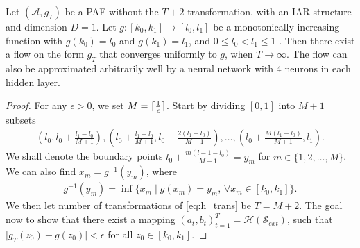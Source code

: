 \begin{lemma}\label{lemma:paf_one_dim}
    Let \((\mathcal{A}, g_T)\) be a PAF without the \(T+2\) transformation, with an IAR-structure and dimension \(D=1\).
    Let \(g\colon [k_0,k_1] \rightarrow [l_0,l_1]\) be a 
    monotonically increasing function with \(g(k_0) = l_0\) and \(g(k_1) = l_1\), and \(0 \leq l_0 < l_1 \leq 1\) . 
    Then there exist a flow on the form \(g_T\) that converges uniformly to \(g\), when \(T \rightarrow \infty\). The flow can also be approximated 
    arbitrarily well by a neural network with \(4\) neurons in each hidden layer.
\end{lemma}
\begin{proof}
    For any \(\epsilon > 0\), we set \(M = \lceil\frac{1}{\epsilon}\rceil\). Start by dividing \([0,1]\) into \(M+1\)
    subsets 
    \begin{align*}
        \left(l_0,l_0 + \frac{l_1-l_0}{M+1}\right), \left(l_0+\frac{l_1-l_0}{M+1}, l_0 + \frac{2(l_1-l_0)}{M+1}\right),\dots, 
        \left(l_0 +\frac{M(l_1-l_0)}{M+1}, l_1\right). 
    \end{align*}
    We shall denote the boundary points \(l_0 + \frac{m(l-1-l_0)}{M+1} = y_{m}\) for \(m\in \{1,2,\dots,M\}\). 
    We can also find \(x_m = g^{-1}(y_m)\), where 
    \begin{align*}
        g^{-1}(y_m) = \inf\{x_m \mid g(x_m) = y_m,\, \forall x_m \in [k_0,k_1]\}.
    \end{align*}
    We then let number of transformations of \cref{eq:h_trans} be \(T = M + 2\).
    The goal now to show that there exist a mapping \((a_t, b_t)^{T}_{t=1} = 
    \mathcal{H}(\mathcal{S}_{ext})\), such that \(\lvert g_T(z_0) - g(z_0)\rvert < \epsilon\) for all \(z_0 \in [k_0,k_1]\). 


\end{proof}
